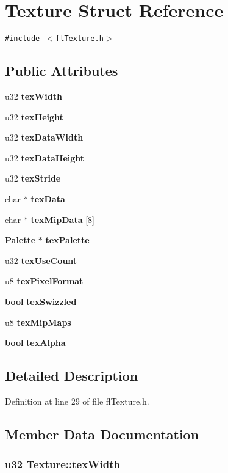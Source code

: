 \section{Texture Struct Reference}
\label{structTexture}
{\tt \#include $<$fl\-Texture.h$>$}

\subsection*{Public Attributes}
\begin{CompactItemize}
\item 
u32 {\bf tex\-Width}
\item 
u32 {\bf tex\-Height}
\item 
u32 {\bf tex\-Data\-Width}
\item 
u32 {\bf tex\-Data\-Height}
\item 
u32 {\bf tex\-Stride}
\item 
char $\ast$ {\bf tex\-Data}
\item 
char $\ast$ {\bf tex\-Mip\-Data} [8]
\item 
{\bf Palette} $\ast$ {\bf tex\-Palette}
\item 
u32 {\bf tex\-Use\-Count}
\item 
u8 {\bf tex\-Pixel\-Format}
\item 
{\bf bool} {\bf tex\-Swizzled}
\item 
u8 {\bf tex\-Mip\-Maps}
\item 
{\bf bool} {\bf tex\-Alpha}
\end{CompactItemize}


\subsection{Detailed Description}




Definition at line 29 of file fl\-Texture.h.

\subsection{Member Data Documentation}
\subsubsection{\setlength{\rightskip}{0pt plus 5cm}u32 {\bf Texture::tex\-Width}}\label{structTexture_7197574d38aa038db43cf47554b6fe17}





